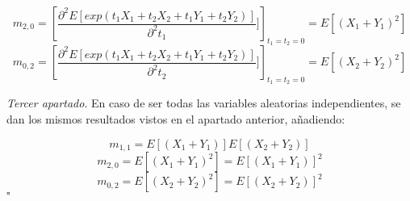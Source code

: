 \documentclass[a4paper, 12pt]{article}
\newcommand*{\qed}{\hfill\ensuremath{\square}}
\begin{document}
    $$m_{2,0} = \left[\frac{\partial^2 E[exp(t_1X_1+t_2X_2+t_1Y_1+t_2Y_2)]}{\partial^2 t_1}]\right]_{t_1=t_2=0}=E[(X_1+Y_1)^2]$$
    $$m_{0,2} = \left[\frac{\partial^2 E[exp(t_1X_1+t_2X_2+t_1Y_1+t_2Y_2)]}{\partial^2 t_2}]\right]_{t_1=t_2=0}=E[(X_2+Y_2)^2]$$

    \textit{Tercer apartado}. En caso de ser todas las variables aleatorias independientes, se dan los mismos resultados
    vistos en el apartado anterior, añadiendo:

    $$m_{1,1}=E[(X_1+Y_1)]E[(X_2+Y_2)]$$
    $$m_{2,0}=E[(X_1+Y_1)^2]=E[(X_1+Y_1)]^2$$
    $$m_{0,2}=E[(X_2+Y_2)^2]=E[(X_2+Y_2)]^2$$
    \qed
    
\end{document}
